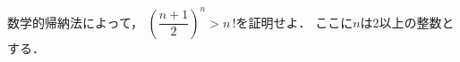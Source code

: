 \documentclass[../../main.tex]{subfiles}
\begin{document}
数学的帰納法によって，
$\displaystyle { \left( \dfrac{n+1}{2} \right) }^n > n \, !$を証明せよ．
ここに$n$は2以上の整数とする．
\end{document}
